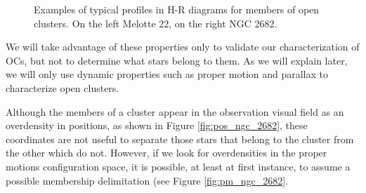 \documentclass[11pt, a4paper, english]{book}
\begin{document}
\begin{figure}[htbp]
\begin{subfigure}{0.9\textwidth}
\begin{subfigure}[t]{0.45\textwidth}
    \end{subfigure}
  \end{subfigure}
  \caption{Examples of typical profiles in H-R diagrams for members of open clusters. On the left Melotte 22, on the right NGC 2682.}
  \label{fig:examples_of_hr_diagrams}
\end{figure}

We will take advantage of these properties only to validate our characterization of OCs,
but not to determine what stars belong to them. As we will explain later,
we will only use dynamic properties such as proper motion and parallax to characterize open clusters.

Although the members of a cluster appear in the observation visual field as an overdensity in positions,
as shown in Figure \ref{fig:pos_ngc_2682},
these coordinates are not useful to separate those stars that belong to the cluster from the other which do not.
However, if we look for overdensities in the proper motions configuration space, it is possible, at least at first instance,
to assume a possible membership delimitation (see Figure \ref{fig:pm_ngc_2682}.
\end{document}
